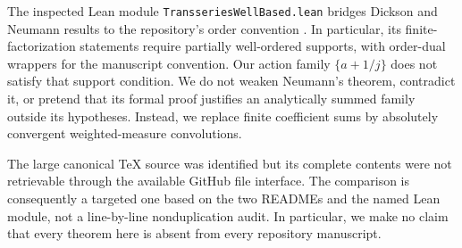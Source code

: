 \documentclass[11pt,a4paper]{article}
\theoremstyle{definition}
\theoremstyle{remark}
\newcommand{\code}[1]{\nolinkurl{#1}}
\numberwithin{equation}{section}
\begin{document}
The inspected Lean module \code{TransseriesWellBased.lean} bridges Dickson and Neumann results to the repository's order convention \cite{repo-neumann}. In particular, its finite-factorization statements require partially well-ordered supports, with order-dual wrappers for the manuscript convention. Our action family $\{a+1/j\}$ does not satisfy that support condition. We do not weaken Neumann's theorem, contradict it, or pretend that its formal proof justifies an analytically summed family outside its hypotheses. Instead, we replace finite coefficient sums by absolutely convergent weighted-measure convolutions.

The large canonical TeX source was identified but its complete contents were not retrievable through the available GitHub file interface. The comparison is consequently a targeted one based on the two READMEs and the named Lean module, not a line-by-line nonduplication audit. In particular, we make no claim that every theorem here is absent from every repository manuscript.
\end{document}

